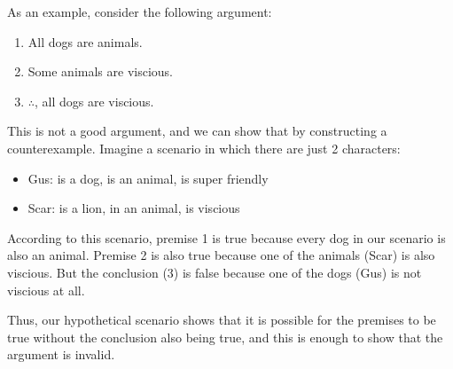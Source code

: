 \documentclass[10pt]{article}
\begin{document}
As an example, consider the following argument:

\begin{enumerate}
  \item All dogs are animals.
  \item Some animals are viscious.
  \item $\therefore$, all dogs are viscious.
\end{enumerate}

This is not a good argument, and we can show that by constructing a counterexample.  Imagine a scenario in which there are just 2 characters:

\begin{itemize}
  \item Gus: is a dog, is an animal, is super friendly
  \item Scar: is a lion, in an animal, is viscious
\end{itemize}

According to this scenario, premise 1 is true because every dog in our scenario is also an animal.  Premise 2 is also true because one of the animals (Scar) is also viscious.  But the conclusion (3) is false because one of the dogs (Gus) is not viscious at all.

Thus, our hypothetical scenario shows that it is possible for the premises to be true without the conclusion also being true, and this is enough to show that the argument is invalid.
\end{document}
